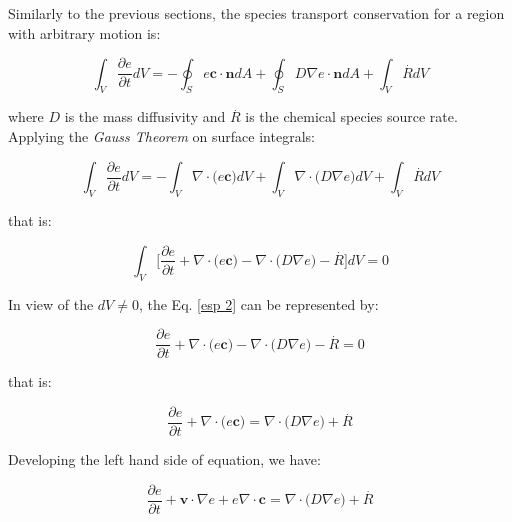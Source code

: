 Similarly to the previous sections, 
the species transport conservation
for a region with arbitrary motion is:


\begin{equation}
 \int_{V} \frac{\partial e}{\partial t} dV
 = 
 - 
 \oint_{S} e \textbf{c} \cdot \textbf{n} dA
 +
 \oint_{S} D \nabla e \cdot \textbf{n} dA
 +
 \int_{V} \overset{.}{R} dV
\end{equation}

\medskip
\noindent
where $D$ is the mass diffusivity and 
$\overset{.}{R}$ is the chemical species source rate.
Applying the \textit{Gauss Theorem} on surface integrals:

\begin{equation}
 \int_{V} \frac{\partial e}{\partial t} dV
 = 
 - 
 \int_{V} \nabla \cdot \big( e \textbf{c} \big) dV
 +
 \int_{V} \nabla \cdot \big( D \nabla e \big) dV
 +
 \int_{V} \overset{.}{R} dV
\end{equation}

\medskip
\noindent
that is:

\begin{equation} \label{esp 2}
 \int_{V} \Bigg[ \frac{\partial e}{\partial t}
 + 
 \nabla \cdot \big( e \textbf{c} \big)
 -
 \nabla \cdot \big( D \nabla e \big)
 -
 \overset{.}{R} \Bigg] dV = 0
\end{equation}



\medskip
\noindent
In view of the $dV \neq 0$,
the Eq. \ref{esp 2} can be represented by:

\begin{equation}
 \frac{\partial e}{\partial t}
 + 
 \nabla \cdot \big( e \textbf{c} \big)
 -
 \nabla \cdot \big( D \nabla e \big)
 -
 \overset{.}{R} = 0
\end{equation}



\medskip
\noindent
that is:

\begin{equation}
 \frac{\partial e}{\partial t}
 +
 \nabla \cdot \big( e \textbf{c} \big)
 =
 \nabla \cdot \big( D \nabla e \big)
 +
 \overset{.}{R}
\end{equation}

\medskip
\noindent
Developing the left hand side of equation, we have:

\begin{equation}
 \frac{\partial e}{\partial t}
 +
 \textbf{v} \cdot \nabla e
 + 
 e \nabla \cdot \textbf{c}
 =
 \nabla \cdot \big( D \nabla e \big)
 +
 \overset{.}{R}
\end{equation}

